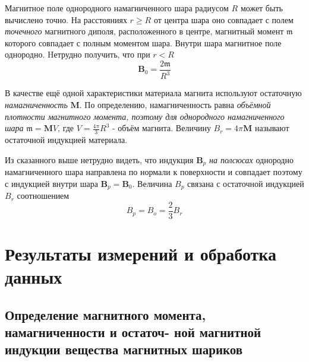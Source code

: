 \documentclass[a4paper,12pt]{article}
\begin{document}
Магнитное поле однородного намагниченного шара радиусом $R$ может быть вычислено точно. На расстояниях $r \geq R$ от центра шара оно совпадает с полем \textit{точечного} магнитного диполя, расположенного в центре, магнитный момент $\mathfrak{m}$ которого совпадает с полным моментом шара. Внутри шара магнитное поле однородно. Hетрудно получить, что при $r < R$ \[\textbf{B}_{0} = \frac{2\mathfrak{m}}{R^3}\]

В качестве ещё одной характеристики материала магнита используют остаточную \textit{намагниченность} $\textbf{M}$. По определению, намагниченность равна \textit{объёмной плотности магнитного момента, поэтому для однородного намагниченного шара} $\mathfrak{m}= \textbf{M}V $, где $V = \frac{4\pi}{3}R^3$ - объём магнита. Величину $B_r = 4\pi \textbf{M}$ называют остаточной индукцией материала.

Из сказанного выше нетрудно видеть, что индукция $\textbf{B}_p$ \textit{на полсюсах} однородно намагниченного шара направлена по нормали к поверхности и совпадает поэтому с индукцией внутри шара $\textbf{B}_p = \textbf{B}_0$. Величина $B_p$ связана с остаточной индукцией $B_r$ соотношением \[B_p = B_o = \frac{2}{3}B_r \]

\section{Результаты измерений и обработка данных}
\subsection{Определение магнитного момента, намагниченности и остаточ- ной магнитной индукции вещества магнитных шариков}
\end{document}
